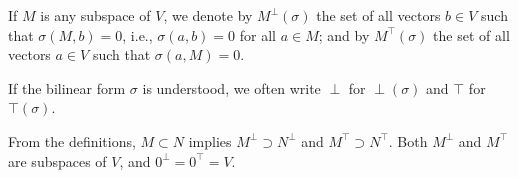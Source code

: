 If $M$ is any subspace of $V$, we denote by $M^{\perp}(\sigma)$ the set of all vectors $b \in V$ such that $\sigma(M, b) = 0$, i.e., $\sigma(a, b) = 0$ for all $a \in M$; and by $M^{\top}(\sigma)$ the set of all vectors $a \in V$ such that $\sigma(a, M) = 0$.

If the bilinear form $\sigma$ is understood, we often write $\perp$ for $\perp(\sigma)$ and $\top$ for $\top(\sigma)$.

From the definitions, $M \subset N$ implies $M^{\perp} \supset N^{\perp}$ and $M^{\top} \supset N^{\top}$. Both $M^{\perp}$ and $M^{\top}$ are subspaces of $V$, and $0^{\perp} = 0^{\top} = V$.
